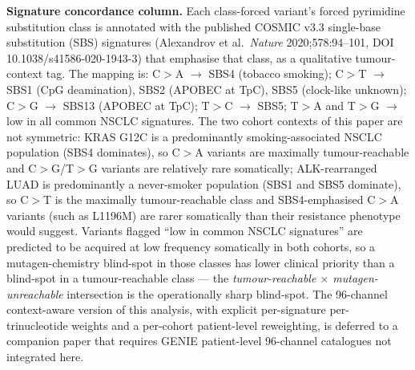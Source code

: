 \documentclass[10pt,a4paper,landscape]{article}
\begin{document}
\noindent\textbf{Signature concordance column.} Each class-forced variant's forced pyrimidine substitution class is annotated with the published COSMIC v3.3 single-base substitution (SBS) signatures (Alexandrov et al.\ \emph{Nature} 2020;578:94--101, DOI 10.1038/s41586-020-1943-3) that emphasise that class, as a qualitative tumour-context tag. The mapping is: C$>$A $\rightarrow$ SBS4 (tobacco smoking); C$>$T $\rightarrow$ SBS1 (CpG deamination), SBS2 (APOBEC at TpC), SBS5 (clock-like unknown); C$>$G $\rightarrow$ SBS13 (APOBEC at TpC); T$>$C $\rightarrow$ SBS5; T$>$A and T$>$G $\rightarrow$ low in all common NSCLC signatures. The two cohort contexts of this paper are not symmetric: KRAS G12C is a predominantly smoking-associated NSCLC population (SBS4 dominates), so C$>$A variants are maximally tumour-reachable and C$>$G/T$>$G variants are relatively rare somatically; ALK-rearranged LUAD is predominantly a never-smoker population (SBS1 and SBS5 dominate), so C$>$T is the maximally tumour-reachable class and SBS4-emphasised C$>$A variants (such as L1196M) are rarer somatically than their resistance phenotype would suggest. Variants flagged ``low in common NSCLC signatures'' are predicted to be acquired at low frequency somatically in both cohorts, so a mutagen-chemistry blind-spot in those classes has lower clinical priority than a blind-spot in a tumour-reachable class --- the \emph{tumour-reachable $\times$ mutagen-unreachable} intersection is the operationally sharp blind-spot. The 96-channel context-aware version of this analysis, with explicit per-signature per-trinucleotide weights and a per-cohort patient-level reweighting, is deferred to a companion paper that requires GENIE patient-level 96-channel catalogues not integrated here.
\end{document}
